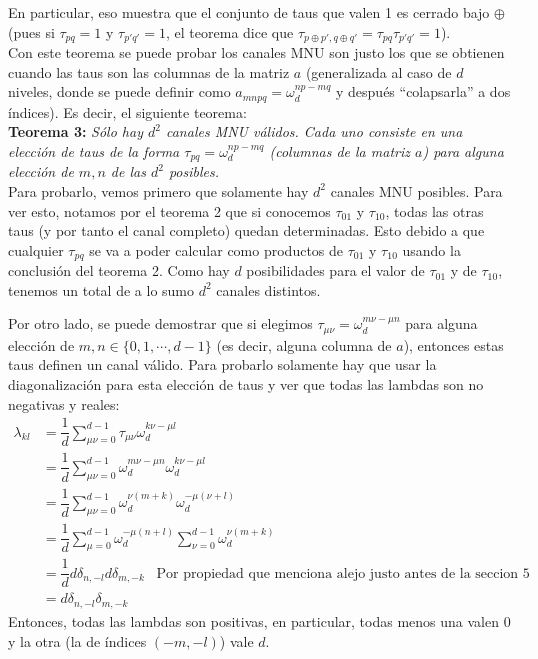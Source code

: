 En particular, eso muestra que el conjunto de taus que valen 1 es cerrado bajo $\oplus$ (pues si $\tau_{pq}= 1$ y $\tau_{p'q'}=1$, el teorema dice que $\tau_{p\oplus p', q\oplus q'} = \tau_{pq} \tau_{p'q'} = 1$).  \\

Con este teorema se puede probar los canales MNU son justo los que se obtienen cuando las taus son las columnas de la matriz $a$ (generalizada al caso de $d$ niveles, donde se  puede definir como $a_{mnpq} = \omega_{d}^{np-mq}$ y después ``colapsarla'' a dos índices). Es decir, el siguiente teorema:\\

\textbf{Teorema 3:} \textit{Sólo hay $d^2$ canales MNU válidos. Cada uno consiste en una elección de taus de la forma $\tau_{pq} = \omega_d^{np-mq}$ (columnas de la matriz $a$) para alguna elección de $m,n$ de las $d^2$ posibles.}\\

Para probarlo, vemos primero que solamente hay $d^2$ canales MNU posibles. Para ver esto, notamos por el teorema 2 que si conocemos $\tau_{01}$ y $\tau_{10}$, todas las otras taus (y por tanto el canal completo) quedan determinadas. Esto debido a que cualquier $\tau_{pq}$ se va a poder calcular como productos de $\tau_{01}$ y $\tau_{10}$ usando la conclusión del teorema 2.  Como hay $d$ posibilidades para el valor de $\tau_{01}$ y de $\tau_{10}$, tenemos un total de a lo sumo  $d^2$ canales distintos. 

Por otro lado, se puede demostrar que si elegimos $\tau_{\mu\nu} = \omega_d^{m\nu-\mu n}$ para alguna elección de $m,n \in \{0,1, \cdots , d-1\}$ (es decir, alguna columna de $a$), entonces estas taus definen un canal válido. Para probarlo solamente hay que usar la diagonalización para esta elección de taus y ver que todas las lambdas son no negativas y reales:
\begin{align*}
\lambda_{kl} &= \dfrac{1}{d} \sum_{\mu \nu = 0}^{d-1} \tau_{\mu\nu} \omega_d^{k\nu-\mu l} \\
& = \dfrac{1}{d} \sum_{\mu \nu = 0}^{d-1} \omega_d^{m\nu-\mu n} \omega_d^{k\nu-\mu l} \\
& = \dfrac{1}{d} \sum_{\mu\nu = 0}^{d-1} \omega_d^{\nu (m+k)} \omega_d^{-\mu(\nu + l)}  \\
& = \dfrac{1}{d} \sum_{\mu=0}^{d-1} \omega_d^{-\mu(n + l)} \sum_{\nu=0}^{d-1} \omega_d^{\nu(m+k)} \\
&= \dfrac{1}{d} d \delta_{n,-l} d \delta_{m,-k} \;\;\; \text{Por propiedad que menciona alejo justo antes de la seccion 5}  \\
& = d \delta_{n,-l} \delta_{m,-k}
\end{align*}
Entonces, todas las lambdas son positivas, en particular, todas menos una valen $0$ y la otra (la de índices $(-m,-l)$) vale $d$.\\

